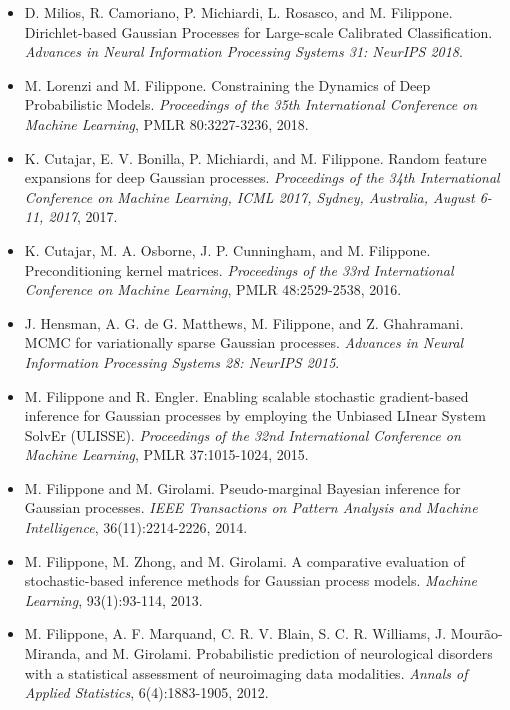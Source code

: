 \documentclass[oneside, a4paper, onecolumn, 10pt]{article}
\begin{document}
\begin{itemize}
\item  D. Milios, R. Camoriano, P. Michiardi, L. Rosasco, and M. Filippone. Dirichlet-based Gaussian Processes for Large-scale Calibrated Classification. \emph{Advances in Neural Information Processing Systems 31: NeurIPS 2018}. %
\item  M. Lorenzi and M. Filippone. Constraining the Dynamics of Deep Probabilistic Models. \emph{Proceedings of the 35th International Conference on Machine Learning}, PMLR 80:3227-3236, 2018.  
\item  K. Cutajar, E. V. Bonilla, P. Michiardi, and M. Filippone. Random feature expansions for deep Gaussian processes. \emph{Proceedings of the 34th International Conference on Machine Learning, ICML 2017, Sydney, Australia, August 6-11, 2017}, 2017.  
\item  K. Cutajar, M. A. Osborne, J. P. Cunningham, and M. Filippone. Preconditioning kernel matrices. \emph{Proceedings of the 33rd International Conference on Machine Learning}, PMLR 48:2529-2538, 2016.  
\item  J. Hensman, A. G. de G. Matthews, M. Filippone, and Z. Ghahramani. MCMC for variationally sparse Gaussian processes. \emph{Advances in Neural Information Processing Systems 28: NeurIPS 2015}. %
\item  M. Filippone and R. Engler. Enabling scalable stochastic gradient-based inference for Gaussian processes by employing the Unbiased LInear System SolvEr (ULISSE). \emph{Proceedings of the 32nd International Conference on Machine Learning}, PMLR 37:1015-1024, 2015.  
\item  M. Filippone and M. Girolami. Pseudo-marginal Bayesian inference for Gaussian processes. \emph{IEEE Transactions on Pattern Analysis and Machine Intelligence}, 36(11):2214-2226, 2014.  
\item  M. Filippone, M. Zhong, and M. Girolami. A comparative evaluation of stochastic-based inference methods for Gaussian process models. \emph{Machine Learning}, 93(1):93-114, 2013.  
\item  M. Filippone, A. F. Marquand, C. R. V. Blain, S. C. R. Williams, J. Mour\~ao-Miranda, and M. Girolami. Probabilistic prediction of neurological disorders with a statistical assessment of neuroimaging data modalities. \emph{Annals of Applied Statistics}, 6(4):1883-1905, 2012.  

\end{itemize}
\end{document}
